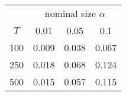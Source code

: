 % 
\begin{tabular}{cccc}
  \hline
  & \multicolumn{3}{c}{nominal size $\alpha$} \\
 $T$ & 0.01 & 0.05 & 0.1 \\
 \hline
100 & 0.009 & 0.038 & 0.067 \\ 
  250 & 0.018 & 0.068 & 0.124 \\ 
  500 & 0.015 & 0.057 & 0.115 \\ 
   \hline
\end{tabular}
